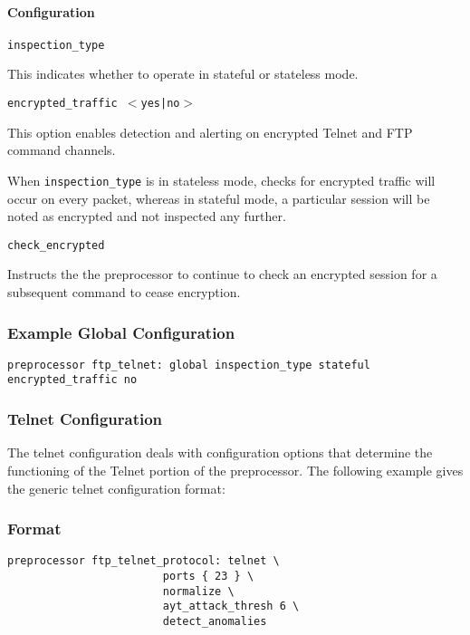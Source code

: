 \documentclass[english]{report}
\newcounter{slistnum}
\newenvironment{slist}
{ \begin{list}{ {\bf \arabic{slistnum}.} }{\usecounter{slistnum} } }
{ \end{list} }
\newenvironment{note}{
\samepage
    \vspace{10pt}{\textsf{
        {\hspace{7pt}\Huge{$\triangle$\hspace{-12.5pt}{\Large{$^!$}}}}\hspace{5pt}
        {\Large{NOTE}}
    }
    }
   \begin{center}
    \par\vspace{-17pt}

    \begin{lrbox}{\savepar}
    \begin{minipage}[r]{6in}
}
{
    \end{minipage}
    \end{lrbox}
    \fbox{
        \usebox{
            \savepar
	}
    }
    \par\vskip10pt
    \end{center}
}
\begin{document}
\paragraph{Configuration}
\begin{slist}
\item \texttt{inspection\_type}

This indicates whether to operate in stateful or stateless mode.

\item \texttt{encrypted\_traffic $<$yes|no$>$}

This option enables detection and alerting on encrypted Telnet and
FTP command channels.

\begin{note}
When \texttt{inspection\_type} is in stateless mode, checks for encrypted
traffic will occur on every packet, whereas in stateful mode, a particular
session will be noted as encrypted and not inspected any further.
\end{note}

\item \texttt{check\_encrypted}

Instructs the the preprocessor to continue to check an encrypted session
for a subsequent command to cease encryption.

\end{slist}

\subsubsection{Example Global Configuration}

\begin{verbatim}
preprocessor ftp_telnet: global inspection_type stateful encrypted_traffic no
\end{verbatim}

\subsubsection{Telnet Configuration}

The telnet configuration deals with configuration options that determine the
functioning of the Telnet portion of the preprocessor.  The following
example gives the generic telnet configuration format:

\subsubsection{Format}
\begin{verbatim}
preprocessor ftp_telnet_protocol: telnet \
                        ports { 23 } \
                        normalize \
                        ayt_attack_thresh 6 \
                        detect_anomalies

\end{verbatim}
\end{document}
